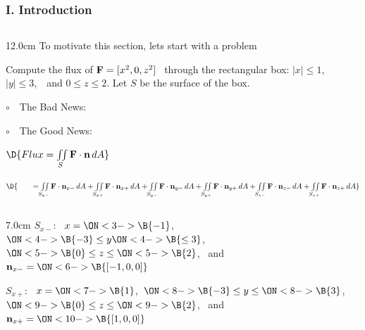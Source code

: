\begin{frame}
\frametitle{I. Introduction}
\scriptsize
\begin{columns}
\begin{column}{12.0cm}
To motivate this section, lets start with a problem

\vspace{0.2cm}

Compute the flux of ${\bf F} = [x^2,0,z^2]$ \, through the rectangular box: $|x| \le 1$, \,\, $|y| \le 3$, \,\, and $0 \le z \le 2$. \quad Let $S$ be the surface of the box.

\vspace{0.1cm}

\vspace{0.2cm}

$\circ$ \,\, The Bad News: 

\vspace{0.2cm}

$\circ$ \,\, The Good News: 

\vspace{0.2cm}
 
$\D{Flux = \iint \limits_{S} {\bf F} \cdot {\bf n}\, dA}$

$\D{ \qquad = \iint \limits_{S_{x-}} {\bf F} \cdot {\bf n}_{x-}\, dA + \iint \limits_{S_{x+}} {\bf F} \cdot {\bf n}_{x+}\, dA + \iint \limits_{S_{y-}} {\bf F} \cdot {\bf n}_{y-}\, dA + \iint \limits_{S_{y+}} {\bf F} \cdot {\bf n}_{y+}\, dA + \iint \limits_{S_{z-}} {\bf F} \cdot {\bf n}_{z-}\, dA + \iint \limits_{S_{z+}} {\bf F} \cdot {\bf n}_{z+}\, dA}$

\vspace{0.2cm}

\begin{columns}
\begin{column}{7.0cm}
	$S_{x-}$: \, 
	$x=\ON<3->{\B{-1}}$,\, 
	$\ON<4->{\B{-3}} \le y \ON<4->{\B{\le 3}}$,\, 
	$\ON<5->{\B{0}} \le z \le \ON<5->{\B{2}}$, \, and \, ${\bf n}_{x-} = 
	\ON<6->{\B{[-1,0,0]}}$
	
	\vspace{0.3cm}
	
	$S_{x+}$: \, 
	$x=\ON<7->{\B{1}}$,\, 
	$\ON<8->{\B{-3}} \le y \le \ON<8->{\B{3}}$,\, 
	$\ON<9->{\B{0}} \le z \le \ON<9->{\B{2}}$, \, and \, ${\bf n}_{x+} = 
	\ON<10->{\B{[1,0,0]}}$
	
	\vspace{0.3cm}
	

\end{column}
\end{columns}
\end{column}
\end{columns}
\end{frame}
